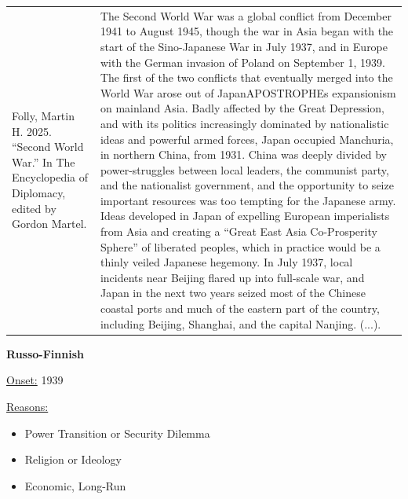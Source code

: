 {\begin{longtable}{p{}p{}}
\\
Folly, Martin H. 2025. “Second World War.” In The Encyclopedia of Diplomacy, edited by Gordon Martel. & The Second World War was a global conflict from December 1941 to August 1945, though the war in Asia began with the start of the Sino-Japanese War in July 1937, and in Europe with the German invasion of Poland on September 1, 1939. The first of the two conflicts that eventually merged into the World War arose out of JapanAPOSTROPHEs expansionism on mainland Asia. Badly affected by the Great Depression, and with its politics increasingly dominated by nationalistic ideas and powerful armed forces, Japan occupied Manchuria, in northern China, from 1931. China was deeply divided by power-struggles between local leaders, the communist party, and the nationalist government, and the opportunity to seize important resources was too tempting for the Japanese army. Ideas developed in Japan of expelling European imperialists from Asia and creating a “Great East Asia Co-Prosperity Sphere” of liberated peoples, which in practice would be a thinly veiled Japanese hegemony. In July 1937, local incidents near Beijing flared up into full-scale war, and Japan in the next two years seized most of the Chinese coastal ports and much of the eastern part of the country, including Beijing, Shanghai, and the capital Nanjing. (...).

\\
\end{longtable}}
\clearpage
         \textbf{Russo-Finnish} 

          \underline{Onset:} 1939         

\underline{Reasons:}
\begin{itemize}
\item Power Transition or Security Dilemma
\item Religion or Ideology
\item Economic, Long-Run
\end{itemize}

